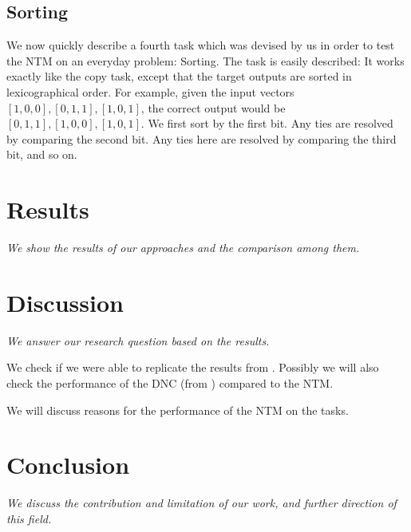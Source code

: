 \documentclass[12pt,twoside]{article}
\newcommand{\taskFigure}[1]{{\centering{
\makebox[\textwidth][c]{\texttt{[image: \#1]}}
}}}
\theoremstyle{plain}
\theoremstyle{definition}
\theoremstyle{remark}
\begin{document}
\subsection{Sorting}
We now quickly describe a fourth task which was devised by us in order to test the NTM on an everyday problem: Sorting. The task is easily described: It works exactly like the copy task, except that the target outputs are sorted in lexicographical order. For example, given the input vectors $[1, 0, 0], [0, 1, 1], [1, 0, 1]$, the correct output would be $[0, 1, 1], [1, 0, 0],  [1, 0, 1]$. We first sort by the first bit. Any ties are resolved by comparing the second bit. Any ties here are resolved by comparing the third bit, and so on.

\section{Results}
\textit{We show the results of our approaches and the comparison among them.}



\taskFigure{../figures/copy_task.pdf}

\taskFigure{../figures/repeat_copy_task.pdf}

\taskFigure{../figures/associative_recall_task.pdf}

\taskFigure{../figures/sorting_task.pdf}

\section{Discussion}
\textit{We answer our research question based on the results.}

We check if we were able to replicate the results from \cite{implementing-ntm}. Possibly we will also check the performance of the DNC (from \cite{original-dnc}) compared to the NTM.

We will discuss reasons for the performance of the NTM on the tasks.

\section{Conclusion}
\textit{We discuss the contribution and limitation of our work, and further direction of this field.}

%
\newpage


\end{document}
